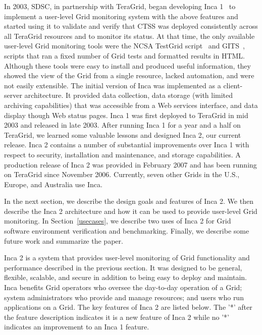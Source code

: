 \documentclass[times,10pt,twocolumn]{article}
\begin{document}
In 2003, SDSC, in partnership with TeraGrid, began developing Inca
1~\cite{inca1} to implement a user-level Grid monitoring system with the above
features and started using it to validate and
verify that CTSS was deployed consistently across all TeraGrid resources and
to monitor its status.  At that time, the only available user-level Grid
monitoring tools were the NCSA TestGrid script~\cite{ncsa-test} and
GITS~\cite{gits}, scripts that ran a fixed number of Grid tests and formatted
results in HTML.  Although these tools were easy to install and produced
useful information, they showed the view of the Grid from a single
resource, lacked automation, and were not easily extensible.  The initial
version of Inca was implemented as a client-server architecture.  It provided
data collection, data storage (with limited archiving capabilities) that was
accessible from a Web services interface, and data display though Web status
pages.  Inca 1 was first deployed to TeraGrid in mid 2003 and released in late
2003. After running Inca 1 for a year and a half on TeraGrid, we learned some
valuable lessons and designed Inca 2, our current release.  Inca 2
contains a number of substantial improvements over Inca 1 with respect to
security, installation and maintenance, and storage capabilities.  A
production release of Inca 2 was provided in February 2007 and has been
running on TeraGrid since November 2006.  Currently, seven other Grids in the
U.S., Europe, and Australia use Inca.  

In the next section, we describe the design goals and features of Inca 2. 
We then describe the Inca 2 architecture and how it can be used to provide
user-level Grid monitoring.  In Section~\ref{usecases}, we describe two 
uses of Inca 2 for Grid software environment verification and benchmarking.  
Finally, we describe some future work and summarize the paper.

  
Inca 2 is a system that provides user-level monitoring of Grid functionality
and performance described in the previous section.  It was designed to be
general, flexible, scalable, and secure in addition to being easy to deploy
and maintain.  Inca benefits Grid operators who oversee the day-to-day
operation of a Grid; system administrators who provide and manage resources;
and users who run applications on a Grid.  The key features of Inca 2 are
listed below.  The '*' after the feature description indicates it is a new
feature of Inca 2 while no '*' indicates an improvement to an Inca 1 feature.
\end{document}
